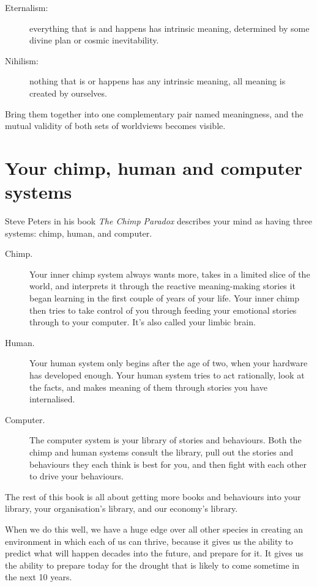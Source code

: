 \begin{description}
\item[Eternalism:] everything that is and happens has intrinsic meaning, determined by some divine plan or cosmic inevitability.
\item[Nihilism:] nothing that is or happens has any intrinsic meaning, all meaning is created by ourselves.
\end{description}


Bring them together into one complementary pair named meaningness, and the mutual validity of both sets of worldviews becomes visible.
\section{Your chimp, human and computer systems}
Steve Peters in his book \emph{The Chimp Paradox}\cite{peters-chimp} describes your mind as having three systems: chimp, human, and computer. 


\begin{description}
\item[Chimp.] Your inner chimp system always wants more, takes in a limited slice of the world, and interprets it through the reactive meaning-making stories it began learning in the first couple of years of your life. Your inner chimp then tries to take control of you through feeding your emotional stories through to your computer. It's also called your limbic brain.


\item[Human.] Your human system only begins after the age of two, when your hardware has developed enough. Your human system tries to act rationally, look at the facts, and makes meaning of them through stories you have internalised. 


\item[Computer.] The computer system is your library of stories and behaviours. Both the chimp and human systems consult the library, pull out the stories and behaviours they each think is best for you, and then fight with each other to drive your behaviours.
\end{description}


The rest of this book is all about getting more books and behaviours into your library, your organisation's library, and our economy's library.


When we do this well, we have a huge edge over all other species in creating an environment in which each of us can thrive, because it gives us the ability to predict what will happen decades into the future, and prepare for it. It gives us the ability to prepare today for the drought that is likely to come sometime in the next 10 years.



